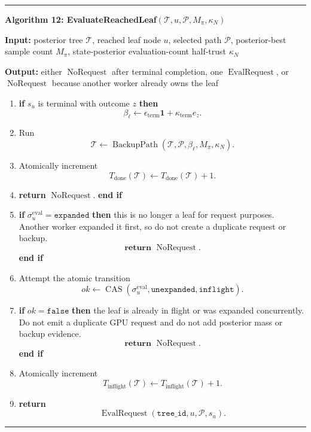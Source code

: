 \documentclass[11pt]{article}
\newcommand{\Tree}{\mathcal{T}}
\newcommand{\Path}{\mathcal{P}}
\newcommand{\BackupPath}{\operatorname{BackupPath}}
\newcommand{\NoRequest}{\operatorname{NoRequest}}
\newcommand{\CAS}{\operatorname{CAS}}
\newenvironment{algorithmblock}[1]
{
  \par\medskip
  \noindent\hrule\par\smallskip
  \noindent\textbf{#1}
  \par\smallskip
}
{
  \par\smallskip\noindent\hrule\par\medskip
}
\newcommand{\Input}{\textbf{Input: }}
\newcommand{\Output}{\textbf{Output: }}
\newcommand{\Return}{\textbf{return }}
\newcommand{\If}{\textbf{if }}
\newcommand{\Then}{\textbf{ then }}
\newcommand{\EndIf}{\textbf{end if}}
\begin{document}
\begin{algorithmblock}{Algorithm 12: EvaluateReachedLeaf\((\Tree,u,\Path,M_\pi,\kappa_N)\)}

\Input posterior tree \(\Tree\), reached leaf node \(u\), selected path \(\Path\), posterior-best sample count \(M_\pi\), state-posterior evaluation-count half-trust \(\kappa_N\)

\Output either \(\NoRequest\) after terminal completion, one \(\operatorname{EvalRequest}\), or \(\NoRequest\) because another worker already owns the leaf

\begin{enumerate}[leftmargin=2em]
  \item \If \(s_u\) is terminal with outcome \(z\) \Then
  \[
  \beta_\ell
  \gets
  \epsilon_{\mathrm{term}}\mathbf{1}
  +
  \kappa_{\mathrm{term}}e_z.
  \]

  \item[] Run
  \[
  \Tree
  \gets
  \BackupPath(\Tree,\Path,\beta_\ell,M_\pi,\kappa_N).
  \]

  \item[] Atomically increment
  \[
  T_{\mathrm{done}}(\Tree)
  \gets
  T_{\mathrm{done}}(\Tree)+1.
  \]

  \item[] \Return \(\NoRequest\). \EndIf

  \item \If \(\sigma^{\mathrm{eval}}_u=\texttt{expanded}\) \Then
  this is no longer a leaf for request purposes. Another worker expanded it
  first, so do not create a duplicate request or backup.
  \[
  \Return \NoRequest.
  \]
  \EndIf

  \item Attempt the atomic transition
  \[
  ok\gets
  \CAS
  \left(
  \sigma^{\mathrm{eval}}_u,
  \texttt{unexpanded},
  \texttt{inflight}
  \right).
  \]

  \item \If \(ok=\texttt{false}\) \Then
  the leaf is already in flight or was expanded concurrently. Do not emit a
  duplicate GPU request and do not add posterior mass or backup evidence.
  \[
  \Return \NoRequest.
  \]
  \EndIf

  \item Atomically increment
  \[
  T_{\mathrm{inflight}}(\Tree)
  \gets
  T_{\mathrm{inflight}}(\Tree)+1.
  \]

  \item \Return
  \[
  \operatorname{EvalRequest}
  \left(
  \texttt{tree\_id},
  u,
  \Path,
  s_u
  \right).
  \]
\end{enumerate}

\end{algorithmblock}
\end{document}
